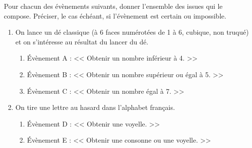 Pour chacun des évènements suivants, donner l'ensemble des issues qui le compose. Préciser, le cas échéant, si l'évènement est certain ou impossible.

\begin{enumerate}
    \item On lance un dé classique (à 6 faces numérotées de 1 à 6, cubique, non truqué) et on s'intéresse au résultat du lancer du dé.
    \begin{enumerate}
        \item{Évènement A : << Obtenir un nombre inférieur à 4. >>}
        \item{Évènement B : << Obtenir un nombre supérieur ou égal à 5. >>}
        \item{Évènement C : << Obtenir un nombre égal à 7. >>}
    \end{enumerate}

    \item On tire une lettre au hasard dans l'alphabet français.
    \begin{enumerate}
        \item{Évènement D : << Obtenir une voyelle. >>}
        \item{Évènement E : << Obtenir une consonne ou une voyelle. >>}
    \end{enumerate}
\end{enumerate}